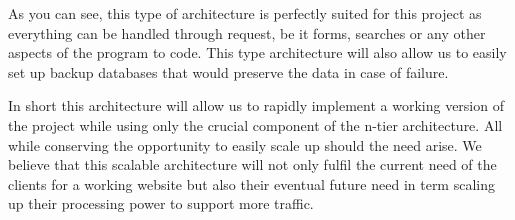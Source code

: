 As you can see, this type of architecture is perfectly suited for this
project as everything can be handled through request, be it forms, searches
or any other aspects of the program to code. This type architecture will
also allow us to easily set up backup databases that would preserve the
data in case of failure. \newline

In short this architecture will allow us to rapidly implement a working
version of the project while using only the crucial component of the n-tier
architecture. All while conserving the opportunity to easily scale up
should the need arise. We believe that this scalable architecture will not
only fulfil the current need of the clients for a working website but also
their eventual future need in term scaling up their processing power to
support more traffic.
